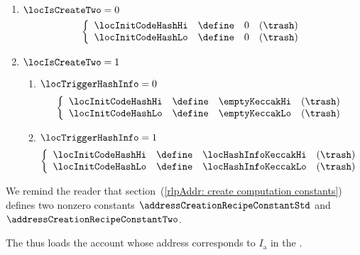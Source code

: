 \begin{description}
\begin{enumerate}
		        \item \If $\locIsCreateTwo = 0$ \Then 
				\[
					\left\{ \begin{array}{lclr}
						\locInitCodeHashHi & \define & 0 & (\trash) \\
						\locInitCodeHashLo & \define & 0 & (\trash) \\
					\end{array} \right.
				\]
		        \item \If $\locIsCreateTwo = 1$ \Then 
				\begin{enumerate}
				        \item \If $\locTriggerHashInfo = 0$
						\[
							\left\{ \begin{array}{lclr}
								\locInitCodeHashHi & \define & \emptyKeccakHi & (\trash) \\
								\locInitCodeHashLo & \define & \emptyKeccakLo & (\trash) \\
							\end{array} \right.
						\]
				        \item \If $\locTriggerHashInfo = 1$
						\[
							\left\{ \begin{array}{lclr}
								\locInitCodeHashHi & \define & \locHashInfoKeccakHi & (\trash) \\
								\locInitCodeHashLo & \define & \locHashInfoKeccakLo & (\trash) \\
							\end{array} \right.
						\]
				\end{enumerate}
		\end{enumerate}
		\saNote{} We remind the reader that section~(\ref{rlpAddr: create computation constants}) defines two nonzero constants $\addressCreationRecipeConstantStd$ and $\addressCreationRecipeConstantTwo$.
\end{description}
\saNote{} The \zkEvm{} thus loads the account whose address corresponds to $I_\text{a}$ in the \cite{EYP}.
